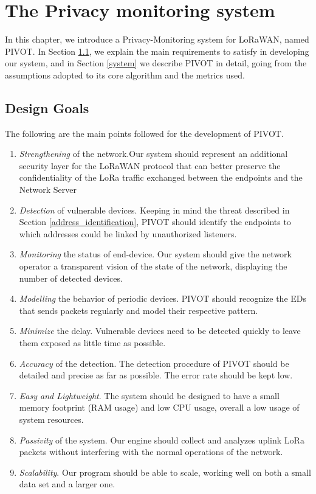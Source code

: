 \chapter{The Privacy monitoring system}
\label{pivot}
In this chapter, we introduce a Privacy-Monitoring system for LoRaWAN, named PIVOT. In Section \ref{goals}, we explain the main requirements to satisfy in developing our system, and in Section \ref{system} we describe PIVOT in detail, going from the assumptions adopted to its core algorithm and the metrics used.

\section{Design Goals}
\label{goals}
The following are the main points followed for the development of PIVOT.
\begin{enumerate}
	\item \textit{Strengthening} of the network.Our system should represent an additional security layer for the LoRaWAN protocol that can better preserve the confidentiality of the LoRa traffic exchanged between the endpoints and the Network Server 
	\item \textit{Detection} of vulnerable devices. Keeping in mind the threat described in Section \ref{address_identification},  PIVOT should identify the endpoints to which addresses could be linked by unauthorized listeners.
	\item \textit{Monitoring} the status of end-device. Our system should give the network operator a transparent vision of the state of the network, displaying the number of detected devices. 
	\item \textit{Modelling} the behavior of periodic devices. PIVOT should recognize the EDs that sends packets regularly and model their respective pattern.
	\item \textit{Minimize} the delay. Vulnerable devices need to be detected quickly to leave them exposed as little time as possible.
	\item \textit{Accuracy} of the detection. The detection procedure of PIVOT should be detailed and precise as far as possible. The error rate should be kept low.
	\item \textit{Easy and Lightweight}. The system should be designed to have a small memory footprint (RAM usage) and low CPU usage, overall a low usage of system resources.
	\item \textit{Passivity} of the system. Our engine should collect and analyzes uplink LoRa packets without interfering with the normal operations of the network.
	\item \textit{Scalability}. Our program should be able to scale, working well on both a small data set and a larger one.
\end{enumerate}

